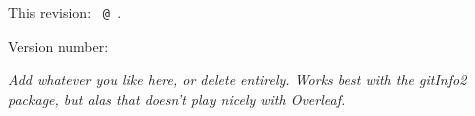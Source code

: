 \thispagestyle{empty}
\begin{center}
    This revision: \texttt{\gitBranch\,@\,\gitAbbrevHash}.

    Version number: \gitRel
\end{center}


\vspace{2em}
\noindent\textit{\color{red}
    Add whatever you like here, or delete entirely. 
    Works best with the gitInfo2 package, but alas that doesn't play nicely with Overleaf.
}